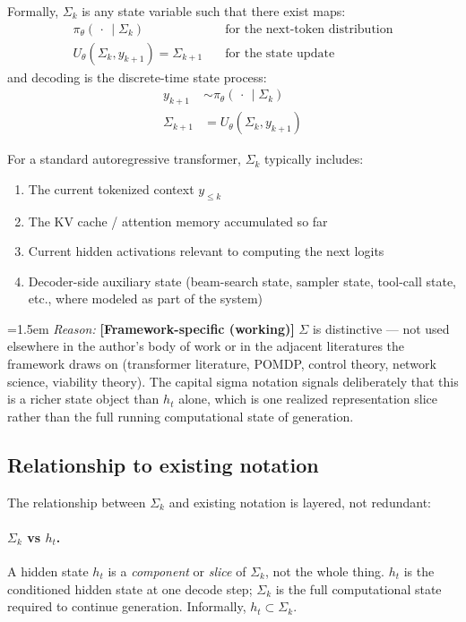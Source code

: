 \documentclass[11pt]{article}
\newcommand{\reason}[2]{%
  \par\nopagebreak
  \begingroup
    \leftskip=1.5em
    \sloppy
    \noindent\textit{Reason:} \textbf{[#1]} #2\par
  \endgroup
  \par\smallskip
}
\begin{document}
Formally, $\Sigma_k$ is any state variable such that there exist maps:
\begin{align*}
\pi_\theta(\,\cdot\, \mid \Sigma_k) &\quad \text{for the next-token distribution} \\
U_\theta(\Sigma_k, y_{k+1}) = \Sigma_{k+1} &\quad \text{for the state update}
\end{align*}
and decoding is the discrete-time state process:
\begin{align*}
y_{k+1} &\sim \pi_\theta(\,\cdot\, \mid \Sigma_k) \\
\Sigma_{k+1} &= U_\theta(\Sigma_k, y_{k+1})
\end{align*}

For a standard autoregressive transformer, $\Sigma_k$ typically includes:
\begin{enumerate}
\item The current tokenized context $y_{\le k}$
\item The KV cache / attention memory accumulated so far
\item Current hidden activations relevant to computing the next logits
\item Decoder-side auxiliary state (beam-search state, sampler state, tool-call state, etc., where modeled as part of the system)
\end{enumerate}

\reason{Framework-specific (working)}{$\Sigma$ is distinctive --- not used elsewhere in the author's body of work or in the adjacent literatures the framework draws on (transformer literature, POMDP, control theory, network science, viability theory). The capital sigma notation signals deliberately that this is a richer state object than $h_t$ alone, which is one realized representation slice rather than the full running computational state of generation.}

\subsection*{Relationship to existing notation}

The relationship between $\Sigma_k$ and existing notation is layered, not redundant:

\paragraph{$\Sigma_k$ vs $h_t$.} A hidden state $h_t$ is a \emph{component} or \emph{slice} of $\Sigma_k$, not the whole thing. $h_t$ is the conditioned hidden state at one decode step; $\Sigma_k$ is the full computational state required to continue generation. Informally, $h_t \subset \Sigma_k$.
\end{document}
